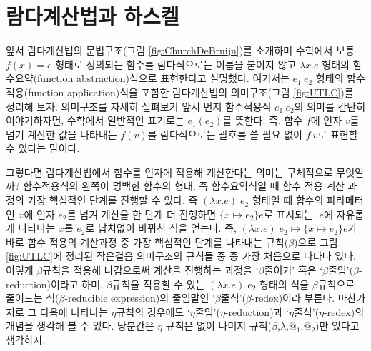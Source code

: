     
    

    \hypertarget{uxb78cuxb2e4uxacc4uxc0b0uxbc95uxacfc-uxd558uxc2a4uxcf08}{%
\section{람다계산법과
하스켈}\label{uxb78cuxb2e4uxacc4uxc0b0uxbc95uxacfc-uxd558uxc2a4uxcf08}}

앞서 람다계산법의 문법구조(그림 \ref{fig:ChurchDeBruijn})를 소개하며
수학에서 보통 \(f(x)=e\) 형태로 정의되는 함수를 람다식으로는 이름을
붙이지 않고 \(\lambda x.e\) 형태의 함수요약(function abstraction)식으로
표현한다고 설명했다. 여기서는 \(e_1~e_2\) 형태의 함수적용(function
application)식을 포함한 람다계산법의 의미구조(그림 \ref{fig:UTLC})를
정리해 보자. 의미구조를 자세히 실펴보기 앞서 먼저 함수적용식
\(e_1~e_2\)의 의미를 간단히 이야기하자면, 수학에서 일반적인 표기로는
\(e_1(e_2)\)를 뜻한다. 즉, 함수 \(f\)에 인자 \(v\)를 넘겨 계산한 값을
나타내는 \(f(v)\)를 람다식으로는 괄호를 쓸 필요 없이 \(f~v\)로 표현할 수
있다는 말이다.

그렇다면 람다계산법에서 함수를 인자에 적용해 계산한다는 의미는
구체적으로 무엇일까? 함수적용식의 왼쪽이 명백한 함수의 형태, 즉
함수요약식일 때 함수 적용 계산 과정의 가장 핵심적인 단계를 진행할 수
있다. 즉 \((\lambda x. e)\;e_2\) 형태일 때 함수의 파라메터인 \(x\)에
인자 \(e_2\)를 넘겨 계산을 한 단계 더 진행하면 \(\{x{\mapsto}e_2\}e\)로
표시되는, \(e\)에 자유롭게 나타나는 \(x\)를 \(e_2\)로 납치없이 바꿔친
식을 얻는다. 즉,
\((\lambda x. e)\;e_2 \longmapsto \{x{\mapsto}e_2\}e\)가 바로 함수
적용의 계산과정 중 가장 핵심적인 단계를 나타내는 규칙(\(\beta\))으로
그림 \ref{fig:UTLC}에 정리된 작은걸음 의미구조의 규칙들 중 중 가장
처음으로 나타나 있다. 이렇게 \(\beta\)규칙을 적용해 나감으로써 계산을
진행하는 과정을 `\(\beta\)줄이기' 혹은
`\(\beta\)줄임'(\(\beta\)-reduction)이라고 하며, \(\beta\)규칙을 적용할
수 있는 \((\lambda x. e)\;e_2\) 형태의 식을 \(\beta\)규칙으로 줄어드는
식(\(\beta\)-reducible expression)의 줄임말인
`\(\beta\)줄식'(\(\beta\)-redex)이라 부른다. 마찬가지로 그 다음에
나타나는 \(\eta\)규칙의 경우에도 `\(\eta\)줄임'(\(\eta\)-reduction)과
`\(\eta\)줄식'(\(\eta\)-redex)의 개념을 생각해 볼 수 있다. 당분간은
\(\eta\) 규칙은 없이 나머지
규칙(\(\beta\),\(\lambda\),\(\textrm{@}_1\),\(\textrm{@}_2\))만 있다고
생각하자.

